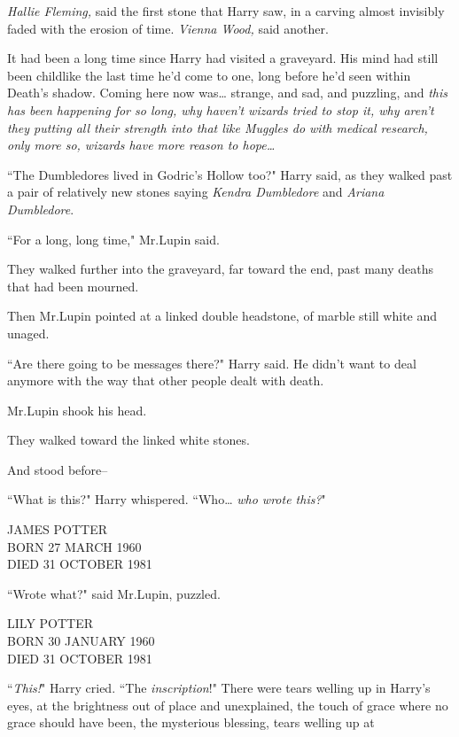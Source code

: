 \emph{Hallie Fleming,} said the first stone that Harry saw, in a carving almost invisibly faded with the erosion of time. \emph{Vienna Wood,} said another.

It had been a long time since Harry had visited a graveyard. His mind had still been childlike the last time he'd come to one, long before he'd seen within Death's shadow. Coming here now was{\ldots} strange, and sad, and puzzling, and \emph{this has been happening for so long, why haven't wizards tried to stop it, why aren't they putting all their strength into that like Muggles do with medical research, only more so, wizards have more reason to hope{\ldots}}

``The Dumbledores lived in Godric's Hollow too?" Harry said, as they walked past a pair of relatively new stones saying \emph{Kendra Dumbledore} and \emph{Ariana Dumbledore}.

``For a long, long time," Mr.\?Lupin said.

They walked further into the graveyard, far toward the end, past many deaths that had been mourned.

Then Mr.\?Lupin pointed at a linked double headstone, of marble still white and unaged.

``Are there going to be messages there?" Harry said. He didn't want to deal anymore with the way that other people dealt with death.

Mr.\?Lupin shook his head.

They walked toward the linked white stones.

And stood before\---

``What is this?" Harry whispered. ``Who{\ldots} \emph{who wrote this?}"

\begin{center}
JAMES POTTER\\
BORN 27 MARCH 1960\\
DIED 31 OCTOBER 1981
\end{center}

``Wrote what?" said Mr.\?Lupin, puzzled.

\begin{center}
LILY POTTER\\
BORN 30 JANUARY 1960\\
DIED 31 OCTOBER 1981
\end{center}

``\emph{This!}" Harry cried. ``The \emph{inscription}!" There were tears welling up in Harry's eyes, at the brightness out of place and unexplained, the touch of grace where no grace should have been, the mysterious blessing, tears welling up at

